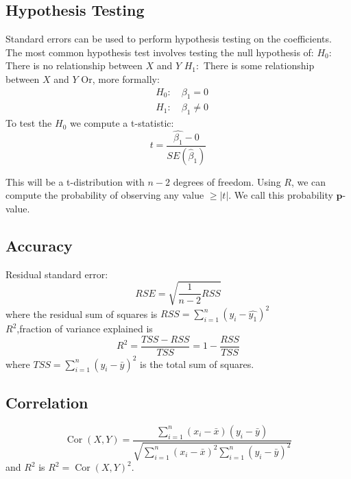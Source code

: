 \documentclass[12pt,a4paper]{article}
\begin{document}
\subsection{Hypothesis Testing}
Standard errors can be used to perform hypothesis testing on the coefficients. The most common hypothesis test involves testing the null hypothesis of:
$H_0:$ There is no relationship between $X$ and $Y$
$H_1:$ There is some relationship between $X$ and $Y$
Or, more formally:
$$
\begin{aligned}
& H_0: \quad \beta_1=0 \\
& H_1: \quad \beta_1 \neq 0
\end{aligned}
$$
To test the $H_0$ we compute a t-statistic:
$$
t=\frac{\hat{\beta_1}-0}{S E\left(\hat{\beta}_1\right)}
$$

This will be a t-distribution with $n-2$ degrees of freedom.
Using $R$, we can compute the probability of observing any value $\geq|t|$. We call this probability $\mathbf{p}$-value.
\subsection{Accuracy}
Residual standard error:
\begin{equation*}
R S E=\sqrt{\frac{1}{n-2} R S S}
\end{equation*}
where the residual sum of squares is $R S S=\sum_{i=1}^n\left(y_i-\hat{y_1}\right)^2$\\
$R^2$,fraction of variance explained is
\begin{equation*}
R^2=\frac{T S S-R S S}{T S S}=1-\frac{R S S}{T S S}
\end{equation*}
where $T S S=\sum_{i=1}^n\left(y_i-\bar{y}\right)^2$ is the total sum of squares.
\subsection{Correlation}
\begin{equation*}
\operatorname{Cor}(X, Y)=\frac{\sum_{i=1}^n\left(x_i-\bar{x}\right)\left(y_i-\bar{y}\right)}{\sqrt{\sum_{i=1}^n\left(x_i-\bar{x}\right)^2 \sum_{i=1}^n\left(y_i-\bar{y}\right)^2}}
\end{equation*}
and $R^2$ is $R^2=\operatorname{Cor}(X, Y)^2$.
\end{document}
